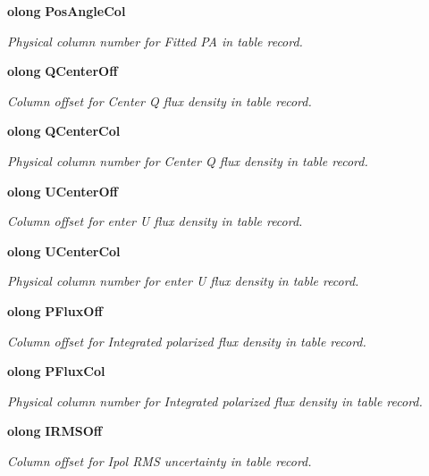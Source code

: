 \begin{CompactItemize}
{\bf olong} {\bf Pos\-Angle\-Col}
\begin{CompactList}\small\item\em Physical column number for Fitted PA in table record. \item\end{CompactList}\item 
{\bf olong} {\bf QCenter\-Off}
\begin{CompactList}\small\item\em Column offset for Center Q flux density in table record. \item\end{CompactList}\item 
{\bf olong} {\bf QCenter\-Col}
\begin{CompactList}\small\item\em Physical column number for Center Q flux density in table record. \item\end{CompactList}\item 
{\bf olong} {\bf UCenter\-Off}
\begin{CompactList}\small\item\em Column offset for enter U flux density in table record. \item\end{CompactList}\item 
{\bf olong} {\bf UCenter\-Col}
\begin{CompactList}\small\item\em Physical column number for enter U flux density in table record. \item\end{CompactList}\item 
{\bf olong} {\bf PFlux\-Off}
\begin{CompactList}\small\item\em Column offset for Integrated polarized flux density in table record. \item\end{CompactList}\item 
{\bf olong} {\bf PFlux\-Col}
\begin{CompactList}\small\item\em Physical column number for Integrated polarized flux density in table record. \item\end{CompactList}\item 
{\bf olong} {\bf IRMSOff}
\begin{CompactList}\small\item\em Column offset for Ipol RMS uncertainty in table record. \item\end{CompactList}\item 

\end{CompactItemize}
